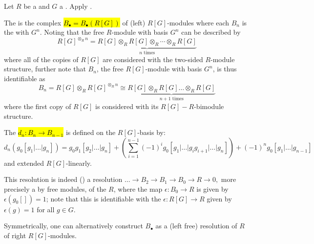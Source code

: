 \begin{definition} \label{definition:unnormalized_bar_resolution_of_a_ring_over_a_group_algebra}
Let $R$ be a  and $G$ a . Apply .

The  is the complex \hl{$B_\bullet = B_{\bullet}(R[G])$} of (left) $R[G]$-modules where each $B_n$ is the  with  $G^n$. Noting that the free $R$-module with basis $G^n$ can be described by 
$$R[G]^{\otimes_R n} = \underbrace{R[G] \otimes_R R[G] \otimes_R \cdots \otimes_R R[G]}_{n \text{ times}}$$
where all of the copies of $R[G]$ are considered with the two-sided $R$-module structure, further note that $B_n$, the free $R[G]$-module with basis $G^n$, is thus identifiable as 
$$B_n = R[G] \otimes_R R[G]^{\otimes_R n} \cong \underbrace{R[G] \otimes_R R[G] \dots \otimes_R R[G]}_{n+1 \text{ times}}$$
where the first copy of $R[G]$ is considered with its $R[G]-R$-bimodule structure.

The  \hl{$d_n: B_n \to B_{n-1}$} is defined on the $R[G]$-basis by:
$$d_n(g_0[g_1 | \dots | g_n]) = g_0 g_1[g_2 | \dots | g_n] + \left( \sum_{i=1}^{n-1} (-1)^i g_0[g_1 | \dots | g_i g_{i+1} | \dots | g_n] \right) + (-1)^n g_0[g_1 | \dots | g_{n-1}]$$
and extended $R[G]$-linearly. 

This resolution is indeed () a resolution
$\dots \to B_2 \to B_1 \to B_0 \to R \to 0,$
more precisely a  by free modules, of the  $R$, where the map $\epsilon: B_0 \to R$ is given by $\epsilon(g_0[]) = 1$; note that this is identifiable with the  $\epsilon: R[G] \to R$ given by $\epsilon(g) = 1$ for all $g \in G$.

Symmetrically, one can alternatively construct $B_\bullet$ as a (left free) resolution of $R$ of right $R[G]$-modules.
\end{definition}